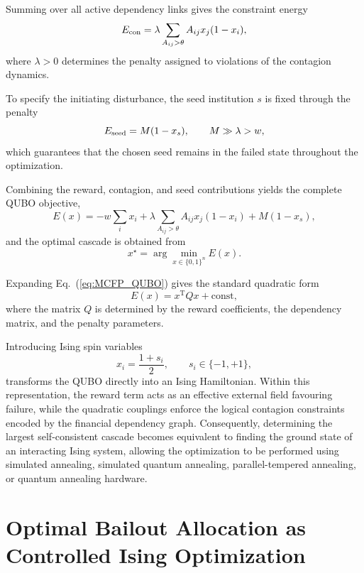 \documentclass[aps,reprint,superscriptaddress,pra]{revtex4-2}
\begin{document}
Summing over all active dependency links gives the constraint energy
\begin{equation}
E_{\rm con}
=
\lambda
\sum_{A_{ij}>\theta}
A_{ij}
x_j(1-x_i),
\end{equation}
where $\lambda>0$ determines the penalty assigned to violations of the contagion dynamics.

To specify the initiating disturbance, the seed institution $s$ is fixed through the penalty
\begin{equation}
E_{\rm seed}
=
M(1-x_s),
\qquad
M\gg\lambda>w,
\end{equation}
which guarantees that the chosen seed remains in the failed state throughout the optimization.

Combining the reward, contagion, and seed contributions yields the complete QUBO objective,
\begin{equation}
E(x)
=
-w\sum_i x_i
+
\lambda
\sum_{A_{ij}>\theta}
A_{ij}
x_j(1-x_i)
+
M(1-x_s),
\label{eq:MCFP_QUBO}
\end{equation}
and the optimal cascade is obtained from
\begin{equation}
x^\star
=
\arg\min_{x\in\{0,1\}^n}
E(x).
\end{equation}

Expanding Eq.~(\ref{eq:MCFP_QUBO}) gives the standard quadratic form
\begin{equation}
E(x)=x^{\mathrm T}Qx+\mathrm{const},
\end{equation}
where the matrix $Q$ is determined by the reward coefficients, the dependency matrix, and the penalty parameters.

Introducing Ising spin variables \cite{lucas2014ising}
\begin{equation}
x_i=\frac{1+s_i}{2},
\qquad
s_i\in\{-1,+1\},
\end{equation}
transforms the QUBO directly into an Ising Hamiltonian. Within this representation, the reward term acts as an effective external field favouring failure, while the quadratic couplings enforce the logical contagion constraints encoded by the financial dependency graph. Consequently, determining the largest self-consistent cascade becomes equivalent to finding the ground state of an interacting Ising system, allowing the optimization to be performed using simulated annealing, simulated quantum annealing, parallel-tempered annealing, or quantum annealing hardware.


\section{Optimal Bailout Allocation as Controlled Ising Optimization}
\label{sec:obap-ising}
\end{document}
